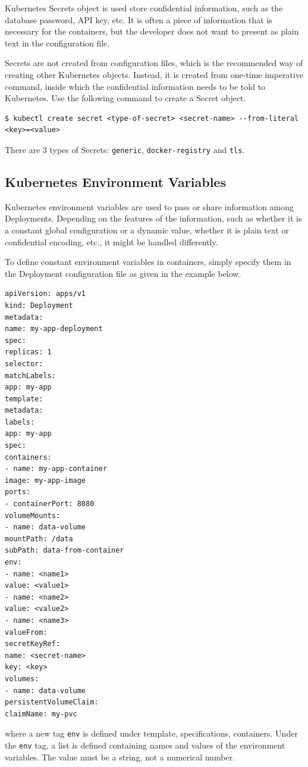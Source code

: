 Kubernetes Secrets object is used store confidential information, such as the database password, API key, etc. It is often a piece of information that is necessary for the containers, but the developer does not want to present as plain text in the configuration file.

Secrets are not created from configuration files, which is the recommended way of creating other Kubernetes objects. Instead, it is created from one-time imperative command, inside which the confidential information needs to be told to Kubernetes. Use the following command to create a Secret object.
\begin{lstlisting}
$ kubectl create secret <type-of-secret> <secret-name> --from-literal <key>=<value>
\end{lstlisting}
There are 3 types of Secrets: \verb|generic|, \verb|docker-registry| and \verb|tls|.

\subsection{Kubernetes Environment Variables}

Kubernetes environment variables are used to pass or share information among Deployments. Depending on the features of the information, such as whether it is a constant global configuration or a dynamic value, whether it is plain text or confidential encoding, etc., it might be handled differently.

To define constant environment variables in containers, simply specify them in the Deployment configuration file as given in the example below.

\begin{lstlisting}
apiVersion: apps/v1
kind: Deployment
metadata:
name: my-app-deployment
spec:
replicas: 1
selector:
matchLabels:
app: my-app
template:
metadata:
labels:
app: my-app
spec:
containers:
- name: my-app-container
image: my-app-image
ports:
- containerPort: 8080
volumeMounts:
- name: data-volume
mountPath: /data
subPath: data-from-container
env:
- name: <name1>
value: <value1>
- name: <name2>
value: <value2>
- name: <name3>
valueFrom:
secretKeyRef:
name: <secret-name>
key: <key>
volumes:
- name: data-volume
persistentVolumeClaim:
claimName: my-pvc
\end{lstlisting}
where a new tag \verb|env| is defined under template, specifications, containers. Under the \verb|env| tag, a list is defined containing names and values of the environment variables. The value must be a string, not a numerical number.

